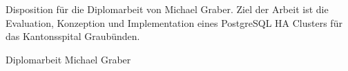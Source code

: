 \documentclass{ibw_disposition}
\begin{document}

    \maketitle
    \clearpage
    \thispagestyle{fancy}
    \begin{zusammenfassung}
        Disposition für die Diplomarbeit von Michael Graber.
        Ziel der Arbeit ist die Evaluation, Konzeption und Implementation eines PostgreSQL HA Clusters für das Kantonsspital Graubünden.
    \end{zusammenfassung}
    \pagestyle{headings}
    \thispagestyle{fancy}

    \begin{managementsummary}
        \begin{flushleft}
            Diplomarbeit Michael Graber
        \end{flushleft}
    \end{managementsummary}

    \clearpage
    {
        \hypersetup{hidelinks}
        \tableofcontents
    }
    \pagestyle{headings}
    \thispagestyle{fancy}
    
    \startThesis %
    
    
    
    
\end{document}
